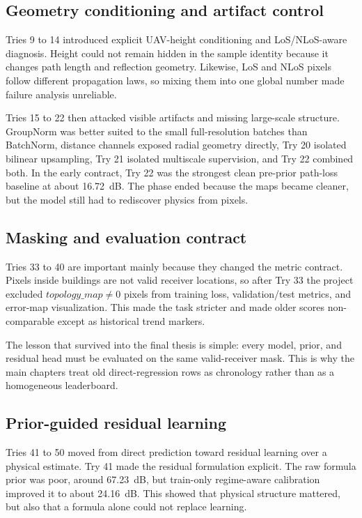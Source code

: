 \subsection{Geometry conditioning and artifact control}

Tries 9 to 14 introduced explicit UAV-height conditioning and LoS/NLoS-aware
diagnosis. Height could not remain hidden in the sample identity because it
changes path length and reflection geometry. Likewise, LoS and NLoS pixels
follow different propagation laws, so mixing them into one global number made
failure analysis unreliable.

Tries 15 to 22 then attacked visible artifacts and missing large-scale structure.
GroupNorm was better suited to the small full-resolution batches than
BatchNorm, distance channels exposed radial geometry directly, Try 20 isolated
bilinear upsampling, Try 21 isolated multiscale supervision, and Try 22
combined both. In the early contract, Try 22 was the strongest clean
pre-prior path-loss baseline at about \SI{16.72}{dB}. The phase ended because
the maps became cleaner, but the model still had to rediscover physics from
pixels.

\subsection{Masking and evaluation contract}

Tries 33 to 40 are important mainly because they changed the metric contract.
Pixels inside buildings are not valid receiver locations, so after Try 33 the
project excluded \(topology\_map \ne 0\) pixels from training loss,
validation/test metrics, and error-map visualization. This made the task
stricter and made older scores non-comparable except as historical trend
markers.

The lesson that survived into the final thesis is simple: every model, prior,
and residual head must be evaluated on the same valid-receiver mask. This is
why the main chapters treat old direct-regression rows as chronology rather
than as a homogeneous leaderboard.

\subsection{Prior-guided residual learning}

Tries 41 to 50 moved from direct prediction toward residual learning over a
physical estimate. Try 41 made the residual formulation explicit. The raw
formula prior was poor, around \SI{67.23}{dB}, but train-only regime-aware
calibration improved it to about \SI{24.16}{dB}. This showed that physical
structure mattered, but also that a formula alone could not replace learning.

